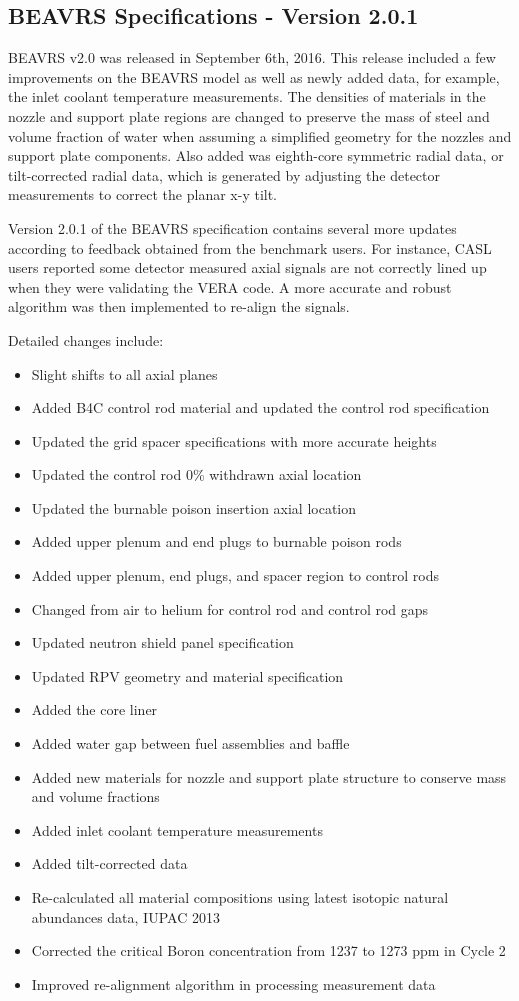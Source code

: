 \documentclass{article}
\begin{document}
\subsection{BEAVRS Specifications - Version 2.0.1}
BEAVRS v2.0 was released in September 6th, 2016. This release included a few improvements on the BEAVRS model as well as newly added data, for example, the inlet coolant temperature measurements. The densities of materials in the nozzle and support plate regions are changed to preserve the mass of steel and volume fraction of water when assuming a simplified geometry for the nozzles and support plate components. Also added was eighth-core symmetric radial data, or tilt-corrected radial data, which is generated by adjusting the detector measurements to correct the planar x-y tilt.

Version 2.0.1 of the BEAVRS specification contains several more updates according to feedback obtained from the benchmark users. For instance, CASL users reported some detector measured axial signals are not correctly lined up when they were validating the VERA code. A more accurate and robust algorithm was then implemented to re-align the signals.

Detailed changes include:
\begin{itemize}
\item Slight shifts to all axial planes
\item Added B4C control rod material and updated the control rod specification
\item Updated the grid spacer specifications with more accurate heights
\item Updated the control rod 0\% withdrawn axial location
\item Updated the burnable poison insertion axial location
\item Added upper plenum and end plugs to burnable poison rods
\item Added upper plenum, end plugs, and spacer region to control rods
\item Changed from air to helium for control rod and control rod gaps
\item Updated neutron shield panel specification
\item Updated RPV geometry and material specification
\item Added the core liner
\item Added water gap between fuel assemblies and baffle
\item Added new materials for nozzle and support plate structure to conserve mass and volume fractions
\item Added inlet coolant temperature measurements
\item Added tilt-corrected data
\item Re-calculated all material compositions using latest isotopic natural abundances data, IUPAC 2013
\item Corrected the critical Boron concentration from 1237 to 1273 ppm in Cycle 2
\item Improved re-alignment algorithm in processing measurement data
\end{itemize}
\end{document}
